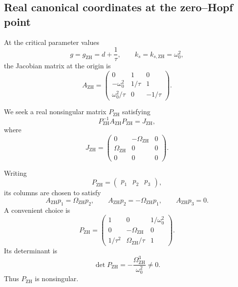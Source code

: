 \documentclass[11pt,reqno]{amsart}
\theoremstyle{plain}
\theoremstyle{definition}
\theoremstyle{remark}
\begin{document}
\subsection{Real canonical coordinates at the zero--Hopf point}
\label{subsec:zero-Hopf-canonical-coordinates}

At the critical parameter values
\[
g=g_{\mathrm{ZH}}
=
d+\frac1\tau,
\qquad
k_s=k_{s,\mathrm{ZH}}
=
\omega_0^2,
\]
the Jacobian matrix at the origin is
\begin{equation}
\label{eq:A-zero-Hopf}
A_{\mathrm{ZH}}
=
\begin{pmatrix}
0&1&0\\[1mm]
-\omega_0^2&1/\tau&1\\[2mm]
\omega_0^2/\tau&0&-1/\tau
\end{pmatrix}.
\end{equation}

We seek a real nonsingular matrix \(P_{\mathrm{ZH}}\) satisfying
\begin{equation}
\label{eq:zero-Hopf-similarity-objective}
P_{\mathrm{ZH}}^{-1}
A_{\mathrm{ZH}}
P_{\mathrm{ZH}}
=
J_{\mathrm{ZH}},
\end{equation}
where
\begin{equation}
\label{eq:zero-Hopf-Jordan-form}
J_{\mathrm{ZH}}
=
\begin{pmatrix}
0&-\Omega_{\mathrm{ZH}}&0\\
\Omega_{\mathrm{ZH}}&0&0\\
0&0&0
\end{pmatrix}.
\end{equation}

Writing
\[
P_{\mathrm{ZH}}
=
\begin{pmatrix}
p_1&p_2&p_3
\end{pmatrix},
\]
its columns are chosen to satisfy
\begin{equation}
\label{eq:zero-Hopf-column-relations}
A_{\mathrm{ZH}}p_1
=
\Omega_{\mathrm{ZH}}p_2,
\qquad
A_{\mathrm{ZH}}p_2
=
-\Omega_{\mathrm{ZH}}p_1,
\qquad
A_{\mathrm{ZH}}p_3=0.
\end{equation}
A convenient choice is
\begin{equation}
\label{eq:P-zero-Hopf}
P_{\mathrm{ZH}}
=
\begin{pmatrix}
1&0&1/\omega_0^2\\[3mm]
0&-\Omega_{\mathrm{ZH}}&0\\[2mm]
1/\tau^2&
\Omega_{\mathrm{ZH}}/\tau&
1
\end{pmatrix}.
\end{equation}
Its determinant is
\begin{equation}
\label{eq:det-P-zero-Hopf}
\det P_{\mathrm{ZH}}
=
-\frac{
\Omega_{\mathrm{ZH}}^3
}{
\omega_0^2
}
\neq0.
\end{equation}
Thus \(P_{\mathrm{ZH}}\) is nonsingular.
\end{document}
